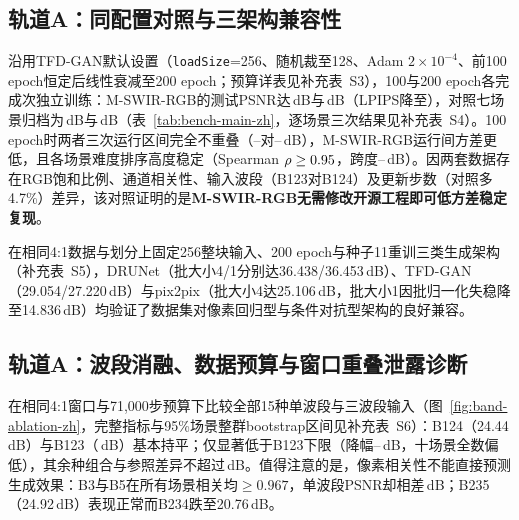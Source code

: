 \documentclass[UTF8,a4paper,10pt]{ctexart}
\begin{document}
\subsection{轨道A：同配置对照与三架构兼容性}\label{sec:same-config}
沿用TFD-GAN默认设置（\texttt{loadSize}=256、随机裁至128、Adam $2\times10^{-4}$、前100 epoch恒定后线性衰减至200 epoch；预算详表见补充表~S3），100与200 epoch各完成\MsEpHundredSeeds{}次独立训练：M-SWIR-RGB的测试PSNR达\MsEpHundredPsnrPm\,dB与\MsEpTwoHundredPsnrPm\,dB（LPIPS降至\MsEpTwoHundredLpips），对照七场景归档为\ChEpHundredPsnrPm\,dB与\ChEpTwoHundredPsnrPm\,dB（表~\ref{tab:bench-main-zh}，逐场景三次结果见补充表~S4）。100 epoch时两者三次运行区间完全不重叠（\MsEpHundredRunMin--\MsEpHundredRunMax{}对\ChEpHundredRunMin--\ChEpHundredRunMax\,dB），M-SWIR-RGB运行间方差更低，且各场景难度排序高度稳定（Spearman $\rho\geq0.95$，跨度\MsSceneMinPsnr--\MsSceneMaxPsnr\,dB）。因两套数据存在RGB饱和比例、通道相关性、输入波段（B123对B124）及更新步数（对照多4.7\%）差异，该对照证明的是\textbf{M-SWIR-RGB无需修改开源工程即可低方差稳定复现}。

\begin{table}[htbp]\centering\small
\caption{同一TFD-GAN实现与训练设置下两套数据的窗口级同配置对照结果。}\label{tab:bench-main-zh}
\vspace{1pt}{\footnotesize\noindent M-SWIR-RGB默认输入B1/B2/B3，对照归档使用其标记为B1/B2/B4的图块；结果为三次独立训练的均值$\pm$样本标准差。\par}

\end{table}

在相同4:1数据与划分上固定256整块输入、200 epoch与种子11重训三类生成架构（补充表~S5），DRUNet（批大小4/1分别达36.438/36.453\,dB）、TFD-GAN（29.054/27.220\,dB）与pix2pix（批大小4达25.106\,dB，批大小1因批归一化失稳降至14.836\,dB）均验证了数据集对像素回归型与条件对抗型架构的良好兼容。

\subsection{轨道A：波段消融、数据预算与窗口重叠泄露诊断}\label{sec:band-ablation}\label{sec:budget}
在相同4:1窗口与71{,}000步预算下比较全部15种单波段与三波段输入（图~\ref{fig:band-ablation-zh}，完整指标与95\%场景整群bootstrap区间见补充表~S6）：B124（24.44\,dB）与B123（\MsEpHundredPsnrPm\,dB）基本持平；仅\BandLowNames{}显著低于B123下限（降幅\BandLowDropMin--\BandLowDropMax\,dB，十场景全数偏低），其余\BandRestCount{}种组合与参照差异不超过\BandRestDiffMax\,dB。值得注意的是，像素相关性不能直接预测生成效果：B3与B5在所有场景相关均$\geq0.967$，单波段PSNR却相差\BandBThreeFiveSingleDiff\,dB；B235（24.92\,dB）表现正常而B234跌至20.76\,dB。
\end{document}
